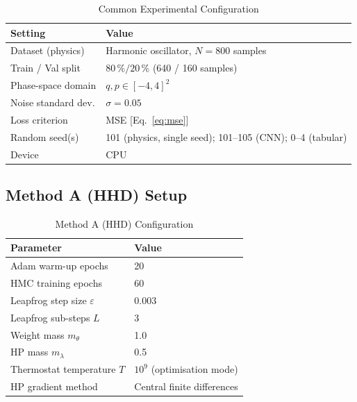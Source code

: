 \documentclass[11pt]{article}
\theoremstyle{definition}
\begin{document}
\begin{table}[H]
\centering
\caption{Common Experimental Configuration}
\label{tab:common_setup}
\renewcommand{\arraystretch}{1.2}
\begin{tabular}{ll}
\toprule
Setting & Value \\
\midrule
Dataset (physics)    & Harmonic oscillator, $N = 800$ samples \\
Train / Val split    & $80\,\% / 20\,\%$ (640 / 160 samples) \\
Phase-space domain   & $q, p \in [-4, 4]^2$ \\
Noise standard dev.  & $\sigma = 0.05$ \\
Loss criterion       & MSE [Eq.~\eqref{eq:mse}] \\
Random seed(s)       & 101 (physics, single seed); 101--105 (CNN); 0--4 (tabular) \\
Device               & CPU \\
\bottomrule
\end{tabular}
\end{table}

\subsection{Method A (HHD) Setup}
\begin{table}[H]
\centering
\caption{Method A (HHD) Configuration}
\label{tab:setup_a}
\renewcommand{\arraystretch}{1.2}
\begin{tabular}{ll}
\toprule
Parameter & Value \\
\midrule
Adam warm-up epochs             & 20 \\
HMC training epochs             & 60 \\
Leapfrog step size $\varepsilon$ & 0.003 \\
Leapfrog sub-steps $L$          & 3 \\
Weight mass $m_\theta$          & 1.0 \\
HP mass $m_\lambda$             & 0.5 \\
Thermostat temperature $T$      & $10^9$ (optimisation mode) \\
HP gradient method              & Central finite differences \\
\bottomrule
\end{tabular}
\end{table}
\end{document}
